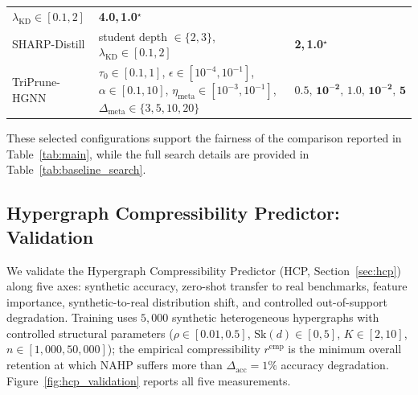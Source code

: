 \documentclass[10pt]{article}
\theoremstyle{plain}
\theoremstyle{definition}
\begin{document}
\begin{table}[t]
\begin{tabular}{lll}
                $\lambda_{\mathrm{KD}}\!\in[0.1,2]$
              & \textbf{4.0,\,1.0}$^{\star}$ \\
SHARP-Distill & student depth $\in\{2,3\}$,
                $\lambda_{\mathrm{KD}}\!\in[0.1,2]$
              & \textbf{2,\,1.0}$^{\star}$ \\
\midrule
\rowcolor{blue!10}
TriPrune-HGNN
              & $\tau_0\!\in[0.1,1]$,
                $\epsilon\!\in[10^{-4},10^{-1}]$,
                $\alpha\!\in[0.1,10]$,
                $\eta_{\mathrm{meta}}\!\in[10^{-3},10^{-1}]$,
                $\Delta_{\mathrm{meta}}\!\in\{3,5,10,20\}$
              & $\mathbf{0.5,\,10^{-2},\,1.0,\,10^{-2},\,5}$ \\
\bottomrule
\end{tabular}
\end{table}

These selected configurations support the fairness of the comparison reported in Table~\ref{tab:main}, while the full search details are provided in Table~\ref{tab:baseline_search}.
\subsection{Hypergraph Compressibility Predictor: Validation}
\label{sec:hcp_validation}

We validate the Hypergraph Compressibility Predictor (HCP, Section~\ref{sec:hcp}) along five axes: synthetic accuracy, zero-shot transfer to real benchmarks, feature importance, synthetic-to-real distribution shift, and controlled out-of-support degradation. Training uses $5{,}000$ synthetic heterogeneous hypergraphs with controlled structural parameters ($\rho\!\in\![0.01,0.5]$, $\mathrm{Sk}(d)\!\in\![0,5]$, $K\!\in\![2,10]$, $n\!\in\![1{,}000,50{,}000]$); the empirical compressibility $r^{\mathrm{emp}}$ is the minimum overall retention at which NAHP suffers more than $\Delta_{\mathrm{acc}}\!=\!1\%$ accuracy degradation. Figure~\ref{fig:hcp_validation} reports all five measurements.
\end{document}
